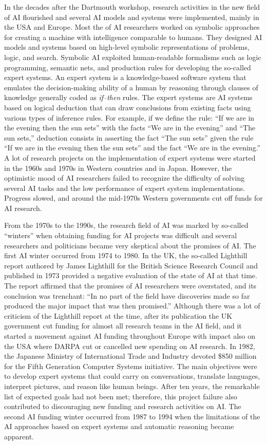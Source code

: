 In the decades after the Dartmouth workshop, research activities in the new field of AI flourished and several AI models and systems were implemented, mainly in the USA and Europe. Most the of AI researchers worked on symbolic approaches for creating a machine with intelligence comparable to humans. They designed AI models and systems based on high-level symbolic representations of problems, logic, and search. Symbolic AI exploited human-readable formalisms such as logic programming, semantic nets, and production rules for developing the so-called expert systems. An expert system is a knowledge-based software system that emulates the decision-making ability of a human by reasoning through clauses of knowledge generally coded as \textit{if--then }rules. The expert systems are AI systems based on logical deduction that can draw conclusions from existing facts using various types of inference rules. For example, if we define the rule: ``If we are in the evening then the sun sets'' with the facts ``We are in the evening'' and ``The sun sets,'' deduction consists in asserting the fact ``The sun sets'' given the rule ``If we are in the evening then the sun sets'' and the fact ``We are in the evening.'' A lot of research projects on the implementation of expert systems were started in the 1960s and 1970s in Western countries and in Japan. However, the optimistic mood of AI researchers failed to recognize the difficulty of solving several AI tasks and the low performance of expert system implementations. Progress slowed, and around the mid-1970s Western governments cut off funds for AI research.

From the 1970s to the 1990s, the research field of AI was marked by so-called ``winters'' when obtaining funding for AI projects was difficult and several researchers and politicians became very skeptical about the promises of AI. The first AI winter occurred from 1974 to 1980. In the UK, the so-called Lighthill report authored by James Lighthill for the British Science Research Council and published in 1973 provided a negative evaluation of the state of AI at that time. The report affirmed that the promises of AI researchers were overstated, and its conclusion was trenchant: ``In no part of the field have discoveries made so far produced the major impact that was then promised.'' Although there was a lot of criticism of the Lighthill report at the time, after its publication the UK government cut funding for almost all research teams in the AI field, and it started a movement against AI funding throughout Europe with impact also on the USA where DARPA cut or cancelled new spending on AI research. In 1982, the Japanese Ministry of International Trade and Industry devoted \$850 million for the Fifth Generation Computer Systems initiative. The main objectives were to develop expert systems that could carry on conversations, translate languages, interpret pictures, and reason like human beings. After ten years, the remarkable list of expected goals had not been met; therefore, this project failure also contributed to discouraging new funding and research activities on AI. The second AI funding winter occurred from 1987 to 1994 when the limitations of the AI approaches based on expert systems and automatic reasoning became apparent.

